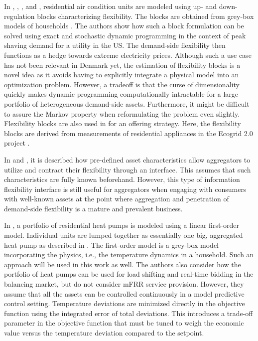 \documentclass[11pt,a4paper]{article}
\begin{document}
In \cite{schaperow2019simulation}, \cite{chanpiwat2020using}, \cite{moglen2020optimal}, and \cite{moglen2020optimal}, residential air condition units are modeled using up- and down-regulation blocks characterizing flexibility. The blocks are obtained from grey-box models of households \cite{siemann2013performance}. The authors show how such a block formulation can be solved using exact and stochastic dynamic programming in the context of peak shaving demand for a utility in the US. The demand-side flexibility then functions as a hedge towards extreme electricity prices. Although such a use case has not been relevant in Denmark yet, the estimation of flexibility blocks is a novel idea as it avoids having to explicitly integrate a physical model into an optimization problem. However, a tradeoff is that the curse of dimensionality quickly makes dynamic programming computationally intractable for a large portfolio of heterogeneous demand-side assets. Furthermore, it might be difficult to assure the Markov property \cite{MarkovProperty} when reformulating the problem even slightly. Flexibility blocks are also used in \cite{bobo2018offering} for an offering strategy. Here, the flexibility blocks are derived from measurements of residential appliances in the Ecogrid 2.0 project \cite{ecogrid}.

In \cite{biegel2013information} and \cite{BiegelConstractingFlexServices}, it is described how pre-defined asset characteristics allow aggregators to utilize and contract their flexibility through an interface. This assumes that such characteristics are fully known beforehand. However, this type of information flexibility interface is still useful for aggregators when engaging with consumers with well-known assets at the point where aggregation and penetration of demand-side flexibility is a mature and prevalent business.

In \cite{biegel2013electricity}, a portfolio of residential heat pumps is modeled using a linear first-order model. Individual units are lumped together as essentially one big, aggregated heat pump as described in \cite{biegel2013lumped}. The first-order model is a grey-box model incorporating the physics, i.e., the temperature dynamics in a household. Such an approach will be used in this work as well. The authors also consider how the portfolio of heat pumps can be used for load shifting and real-time bidding in the balancing market, but do not consider mFRR service provision. However, they assume that all the assets can be controlled continuously in a  model predictive control  setting. Temperature deviations are minimized directly in the objective function using the integrated error of total deviations. This introduces a trade-off parameter in the objective function that must be tuned to weigh the economic value versus the temperature deviation compared to the setpoint.
\end{document}

